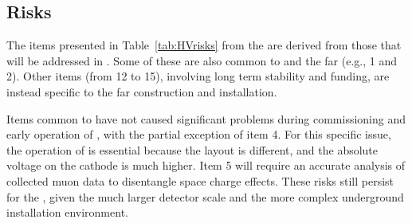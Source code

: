 %
%
%

\subsection{Risks}
\label{sec:fddp-hv-org-risk}


The items presented in %
Table~\ref{tab:HVrisks} from the  are derived from those that will be addressed in  %
.  Some of these are also common to  and the  far  (e.g., 1 and 2). Other  %
items (from 12 to 15), involving long term stability and funding, are instead specific to the  far %
 construction and installation. 

Items common to   have not caused significant problems during commissioning and early operation of , with the partial exception of  %
item 4. For this specific issue, the operation of  is essential because the  layout is different, and the absolute voltage on the cathode is much higher. 
Item 5 will require an accurate analysis of collected muon data  %
to disentangle space charge effects. 
These risks still persist for the , %
given the much larger detector scale and the more complex underground installation environment.



